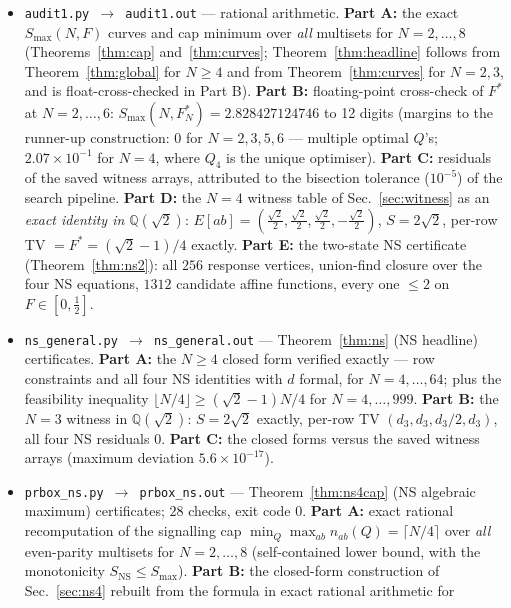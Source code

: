 \documentclass[aps,pra,reprint,superscriptaddress,floatfix]{revtex4-2}
\begin{document}
\begin{itemize}\raggedright
\item \texttt{audit1.py $\to$ audit1.out} --- rational arithmetic.
  \textbf{Part A:} the exact $S_{\max}(N,F)$ curves and cap minimum over
  \emph{all} multisets for $N=2,\dots,8$ (Theorems~\ref{thm:cap} and~\ref{thm:curves};
  Theorem~\ref{thm:headline} follows from Theorem~\ref{thm:global} for $N\ge4$ and from Theorem~\ref{thm:curves} for
  $N=2,3$, and is float-cross-checked in Part B).
  \textbf{Part B:} floating-point cross-check of $F^*$ at $N=2,\dots,6$:
  $S_{\max}(N,F^*_N)=2.828427124746$ to 12 digits (margins to the runner-up
  construction: $0$ for $N=2,3,5,6$ --- multiple optimal $Q$'s;
  $2.07\times10^{-1}$ for $N=4$, where $Q_4$ is the unique optimiser).
  \textbf{Part C:} residuals of the saved witness arrays, attributed to the
  bisection tolerance ($10^{-5}$) of the search pipeline.
  \textbf{Part D:} the $N=4$ witness table of Sec.~\ref{sec:witness} as an
  \emph{exact identity in $\mathbb{Q}(\sqrt2)$}: $E[ab]=(\tfrac{\sqrt2}{2},
  \tfrac{\sqrt2}{2}, \tfrac{\sqrt2}{2}, -\tfrac{\sqrt2}{2})$,
  $S=2\sqrt2$, per-row TV $=F^*=(\sqrt2-1)/4$ exactly.
  \textbf{Part E:} the two-state NS certificate (Theorem~\ref{thm:ns2}): all $256$ response vertices, union-find closure over the four NS
  equations, $1312$ candidate affine functions, every one $\le2$ on
  $F\in[0,\tfrac12]$.
\item \texttt{ns\_general.py $\to$ ns\_general.out} --- Theorem~\ref{thm:ns}
  (NS headline) certificates. \textbf{Part A:} the $N\ge4$ closed form
  verified exactly --- row constraints and all four NS identities with $d$
  formal, for $N=4,\dots,64$; plus the feasibility inequality
  $\lfloor N/4\rfloor\ge(\sqrt2-1)N/4$ for $N=4,\dots,999$.
  \textbf{Part B:} the $N=3$ witness in $\mathbb{Q}(\sqrt2)$:
  $S=2\sqrt2$ exactly, per-row TV $(d_3,d_3,d_3/2,d_3)$, all four NS
  residuals $0$. \textbf{Part C:} the closed forms versus the saved witness
  arrays (maximum deviation $5.6\times10^{-17}$).
\item \texttt{prbox\_ns.py $\to$ prbox\_ns.out} --- Theorem~\ref{thm:ns4cap} (NS
  algebraic maximum) certificates; $28$ checks, exit code $0$.
  \textbf{Part A:} exact rational recomputation of the signalling cap
  $\min_Q\max_{ab}n_{ab}(Q)=\lceil N/4\rceil$ over \emph{all} even-parity
  multisets for $N=2,\dots,8$ (self-contained lower bound, with the
  monotonicity $S_{\mathrm{NS}}\le S_{\max}$).
  \textbf{Part B:} the closed-form construction of Sec.~\ref{sec:ns4} rebuilt from the formula in exact rational arithmetic for

\end{itemize}
\end{document}
